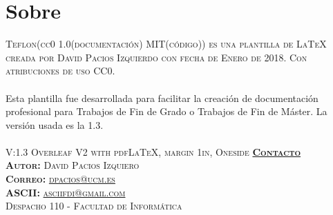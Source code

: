 \newpage
\chapter*{Sobre \teflon}
\noindent
\textsc{Teflon(cc0 1.0(documentación) MIT(código))%
es una plantilla de \LaTeX\phantom{} creada por David Pacios Izquierdo con fecha de Enero de 2018. Con atribuciones de uso CC0.}\\\\
\noindent
Esta plantilla fue desarrollada para facilitar la creación de documentación profesional para Trabajos de Fin de Grado o Trabajos de Fin de Máster. La versión usada es la 1.3.\\\\
\noindent
V:\textsc{1.3 Overleaf V2 with pdfLaTeX, margin 1in, Oneside}
\vfill
\noindent
\textsc{\textbf{\underline{Contacto}}\\ \textbf{Autor:} David Pacios Izquiero \\ \textbf{Correo:} \url{dpacios@ucm.es}\\ \textbf{ASCII:} \url{asciifdi@gmail.com}\\ Despacho 110 - Facultad de Informática}
